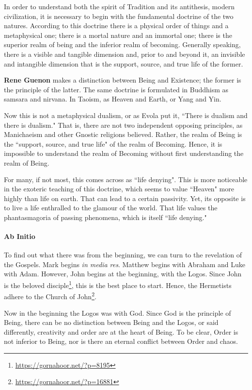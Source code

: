 \begin{quotex}
In order to understand both the spirit of Tradition and its antithesis, modern civilization, it is necessary to begin with the fundamental doctrine of the two natures. According to this doctrine there is a physical order of things and a metaphysical one; there is a mortal nature and an immortal one; there is the superior realm of being and the inferior realm of becoming. Generally speaking, there is a visible and tangible dimension and, prior to and beyond it, an invisible and intangible dimension that is the support, source, and true life of the former. 

\end{quotex}
\textbf{Rene Guenon} makes a distinction between Being and Existence; the former is the principle of the latter. The same doctrine is formulated in Buddhism as samsara and nirvana. In Taoism, as Heaven and Earth, or Yang and Yin.

Now this is not a metaphysical dualism, or as Evola put it, ``There is dualism and there is dualism." That is, there are not two independent opposing principles, as Manichaeism and other Gnostic religions believed. Rather, the realm of Being is the ``support, source, and true life" of the realm of Becoming. Hence, it is impossible to understand the realm of Becoming without first understanding the realm of Being.

For many, if not most, this comes across as ``life denying". This is more noticeable in the exoteric teaching of this doctrine, which seems to value ``Heaven" more highly than life on earth. That can lead to a certain passivity. Yet, its opposite is to live a life enthralled to the glamour of the world. That life values the phantasmagoria of passing phenomena, which is itself ``life denying."

\paragraph{Ab Initio}
To find out what there was from the beginning, we can turn to the revelation of the Gospels. Mark begins \emph{in media res}. Matthew begins with Abraham and Luke with Adam. However, John begins at the beginning, with the Logos. Since John is the beloved disciple\footnote{\url{https://gornahoor.net/?p=8195}}, this is the best place to start. Hence, the Hermetists adhere to the Church of John\footnote{\url{https://gornahoor.net/?p=16881}}.

Now in the beginning the Logos was with God. Since God is the principle of Being, there can be no distinction between Being and the Logos, or said differently, creativity and order are at the heart of Being. To be clear, Order is not inferior to Being, nor is there an eternal conflict between Order and chaos.

